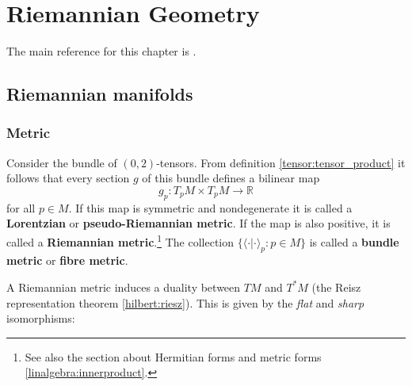 \chapter{Riemannian Geometry}\label{chapter:riemann}

    The main reference for this chapter is \cite{petersen}.

\section{Riemannian manifolds}
\subsection{Metric}

    \begin{definition}
        Consider the bundle of $(0,2)$-tensors. From definition \ref{tensor:tensor_product} it follows that every section $g$ of this bundle defines a bilinear map \[g_p:T_pM\times T_pM\rightarrow\mathbb{R}\] for all $p\in M$. If this map is symmetric and nondegenerate it is called a \textbf{Lorentzian} or \textbf{pseudo-Riemannian metric}. If the map is also positive, it is called a \textbf{Riemannian metric}.\footnote{See also the section about Hermitian forms and metric forms \ref{linalgebra:innerproduct}.} The collection $\{\langle\cdot|\cdot\rangle_p:p\in M\}$ is called a \textbf{bundle metric} or \textbf{fibre metric}.
    \end{definition}

    A Riemannian metric induces a duality between $TM$ and $T^*M$ (the Reisz representation theorem \ref{hilbert:riesz}). This is given by the \textit{flat} and \textit{sharp} isomorphisms:

